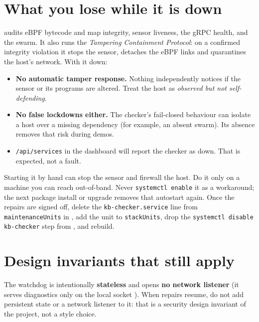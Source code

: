 \section{What you lose while it is down}
 audits eBPF bytecode and map integrity, sensor liveness, the  gRPC health, and the swarm.
It also runs the \emph{Tampering Containment Protocol}: on a confirmed integrity violation it stops the sensor,
detaches the eBPF links and quarantines the host's network. With it down:
\begin{itemize}
\item \textbf{No automatic tamper response.} Nothing independently notices if the sensor or its programs are altered. Treat the host as \emph{observed but not self-defending}.
\item \textbf{No false lockdowns either.} The checker's fail-closed behaviour can isolate a host over a missing dependency (for example, an absent swarm). Its absence removes that risk during demos.
\item \texttt{/api/services} in the dashboard will report the checker as down. That is expected, not a fault.
\end{itemize}

\begin{kbwarn}
Starting it by hand can stop the sensor and firewall the host. Do it only on a machine you can reach
out-of-band. Never \texttt{systemctl enable} it as a workaround; the next package install or upgrade removes
that autostart again. Once the repairs are signed off, delete the \texttt{kb-checker.service} line from
\texttt{maintenanceUnits} in , add the unit to \texttt{stackUnits}, drop the
\texttt{systemctl disable kb-checker} step from , and rebuild.
\end{kbwarn}

\section{Design invariants that still apply}
The watchdog is intentionally \textbf{stateless} and opens \textbf{no network listener} (it serves diagnostics only
on the local socket ). When repairs resume, do not add persistent state or a network
listener to it: that is a security design invariant of the project, not a style choice.
